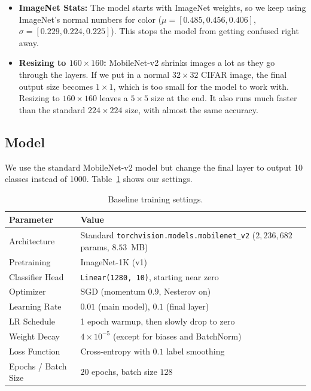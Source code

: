 \documentclass[11pt,a4paper]{article}
\begin{document}
\begin{itemize}

\item \textbf{ImageNet Stats:} The model starts with ImageNet weights, so we keep using ImageNet's normal numbers for color ($\mu=[0.485, 0.456, 0.406]$, $\sigma=[0.229, 0.224, 0.225]$). This stops the model from getting confused right away.

\item \textbf{Resizing to $160\times160$:} MobileNet-v2 shrinks images a lot as they go through the layers. If we put in a normal $32\times32$ CIFAR image, the final output size becomes $1\times1$, which is too small for the model to work with. Resizing to $160\times160$ leaves a $5\times5$ size at the end. It also runs much faster than the standard $224\times224$ size, with almost the same accuracy.

\end{itemize}

\subsection{Model }

We use the standard MobileNet-v2 model but change the final layer to output 10 classes instead of 1000. Table~\ref{tab:config} shows our settings.

\begin{table}[ht]
\centering
\begin{tabular}{@{}ll@{}}
\toprule
\textbf{Parameter} & \textbf{Value} \\
\midrule
Architecture & Standard \texttt{torchvision.models.mobilenet\_v2} ($2{,}236{,}682$ params, $8.53$~MB) \\
Pretraining & ImageNet-1K (v1) \\
Classifier Head & \texttt{Linear(1280, 10)}, starting near zero \\
Optimizer & SGD (momentum $0.9$, Nesterov on) \\
Learning Rate & $0.01$ (main model), $0.1$ (final layer) \\
LR Schedule & 1 epoch warmup, then slowly drop to zero \\
Weight Decay & $4\times10^{-5}$ (except for biases and BatchNorm) \\
Loss Function & Cross-entropy with $0.1$ label smoothing \\
Epochs / Batch Size & $20$ epochs, batch size $128$ \\
\bottomrule
\end{tabular}
\caption{Baseline training settings.}
\label{tab:config}
\end{table}
\end{document}
